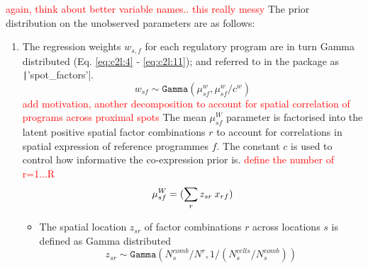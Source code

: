 \documentclass[11pt,a4paper]{article}
\newcommand{\red}{\textcolor{red}}
\begin{document}
\red{again, think about better variable names.. this really messy}
The prior distribution on the unobserved parameters are as follows:
\begin{enumerate}
    \item The regression weights $w_{s,f}$ for each regulatory program are in turn Gamma distributed (Eq. \ref{eq:c2l:4} - \ref{eq:c2l:11}); and referred to in the package as \texttt|'spot_factors'|. \newline
    \begin{equation} \label{eq:c2l:4}
    w_{sf} \sim \mathtt{Gamma}({\mu}^{w}_{sf}, {\mu}^{w}_{sf} / c^{w})
    \end{equation}
    \red{add motivation, another decomposition to account for spatial correlation of programs across proximal spots}
    The mean ${\mu}^{W}_{sf}$ parameter is factorised into the latent positive spatial factor combinations $r$ to account for correlations in spatial expression of reference programmes $f$. The constant $c$ is used to control how informative the co-expression prior is.
    \red{define the number of r=1...R}
    \begin{equation} \label{eq:c2l:5}
    {\mu}^{W}_{sf} = (\sum_{r} {z_{sr} \: x_{rf}})\\
    \end{equation}
    
    \begin{itemize}
        \item The spatial location $z_{sr}$ of factor combinations $r$ across locations $s$ is defined as Gamma distributed
        \begin{equation} \label{eq:c2l:6}
        z_{sr} \sim \mathtt{Gamma}(N_s^{comb} / N^r, 1 / (N_s^{cells} / N_s^{comb}))
        \end{equation}
    

\end{itemize}
\end{enumerate}
\end{document}
